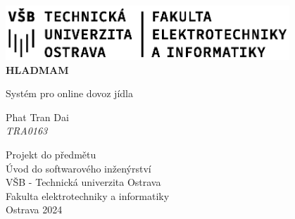 \begin{titlepage}
    \begin{center}
        \includegraphics[width=0.8\textwidth]{assets/fei-logo.eps}\\
        \vspace*{1cm}
        \Huge
        \textbf{\textsc{HLADMAM}}
            
        \vspace{0.3cm}
        \LARGE
        Systém pro online dovoz jídla
            
        \vspace{1.5cm}
            
        {Phat Tran Dai} \\
        
        \vspace{0.3cm}
        \large{\textit{TRA0163}} 
        \vfill
        
        Projekt do předmětu \\
        Úvod do softwarového inženýrství \\
        \vspace{0.8cm}
        \Large
        VŠB - Technická univerzita Ostrava\\
        Fakulta elektrotechniky a informatiky\\
            
        \vspace{0.8cm}
        \Large
        Ostrava 2024\\
            
    \end{center}	
\end{titlepage}

\newpage
\pagestyle{mycustomstyle} 

